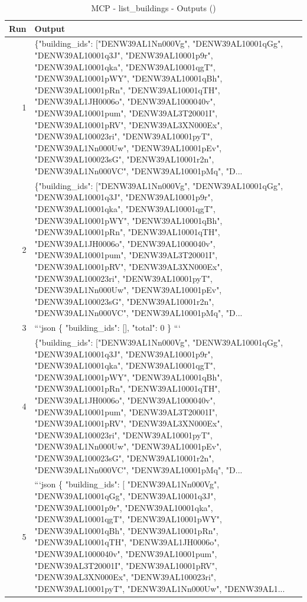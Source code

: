 \documentclass[a4paper,11pt]{article}
\begin{document}
\begin{table}[ht]
\centering
\scriptsize
\caption{MCP - list\_buildings - Outputs ()}
\label{tab:mcp\_list\_buildings\_outputs\_}
\begin{tabular}{r p{12cm}}
\hline
Run & Output \\
\hline
1 & \{"building\_ids": ["DENW39AL1Nn000Vg", "DENW39AL10001qGg", "DENW39AL10001q3J", "DENW39AL10001p9r", "DENW39AL10001qka", "DENW39AL10001qgT", "DENW39AL10001pWY", "DENW39AL10001qBh", "DENW39AL10001pRn", "DENW39AL10001qTH", "DENW39AL1JH0006o", "DENW39AL1000040v", "DENW39AL10001pum", "DENW39AL3T20001I", "DENW39AL10001pRV", "DENW39AL3XN000Ex", "DENW39AL100023ri", "DENW39AL10001pyT", "DENW39AL1Nn000Uw", "DENW39AL10001pEv", "DENW39AL100023sG", "DENW39AL10001r2n", "DENW39AL1Nn000VC", "DENW39AL10001pMq", "D... \\
2 & \{"building\_ids": ["DENW39AL1Nn000Vg", "DENW39AL10001qGg", "DENW39AL10001q3J", "DENW39AL10001p9r", "DENW39AL10001qka", "DENW39AL10001qgT", "DENW39AL10001pWY", "DENW39AL10001qBh", "DENW39AL10001pRn", "DENW39AL10001qTH", "DENW39AL1JH0006o", "DENW39AL1000040v", "DENW39AL10001pum", "DENW39AL3T20001I", "DENW39AL10001pRV", "DENW39AL3XN000Ex", "DENW39AL100023ri", "DENW39AL10001pyT", "DENW39AL1Nn000Uw", "DENW39AL10001pEv", "DENW39AL100023sG", "DENW39AL10001r2n", "DENW39AL1Nn000VC", "DENW39AL10001pMq", "D... \\
3 & ```json
\{
  "building\_ids": [],
  "total": 0
\}
``` \\
4 & \{"building\_ids": ["DENW39AL1Nn000Vg", "DENW39AL10001qGg", "DENW39AL10001q3J", "DENW39AL10001p9r", "DENW39AL10001qka", "DENW39AL10001qgT", "DENW39AL10001pWY", "DENW39AL10001qBh", "DENW39AL10001pRn", "DENW39AL10001qTH", "DENW39AL1JH0006o", "DENW39AL1000040v", "DENW39AL10001pum", "DENW39AL3T20001I", "DENW39AL10001pRV", "DENW39AL3XN000Ex", "DENW39AL100023ri", "DENW39AL10001pyT", "DENW39AL1Nn000Uw", "DENW39AL10001pEv", "DENW39AL100023sG", "DENW39AL10001r2n", "DENW39AL1Nn000VC", "DENW39AL10001pMq", "D... \\
5 & ```json
\{
  "building\_ids": [
    "DENW39AL1Nn000Vg",
    "DENW39AL10001qGg",
    "DENW39AL10001q3J",
    "DENW39AL10001p9r",
    "DENW39AL10001qka",
    "DENW39AL10001qgT",
    "DENW39AL10001pWY",
    "DENW39AL10001qBh",
    "DENW39AL10001pRn",
    "DENW39AL10001qTH",
    "DENW39AL1JH0006o",
    "DENW39AL1000040v",
    "DENW39AL10001pum",
    "DENW39AL3T20001I",
    "DENW39AL10001pRV",
    "DENW39AL3XN000Ex",
    "DENW39AL100023ri",
    "DENW39AL10001pyT",
    "DENW39AL1Nn000Uw",
    "DENW39AL1... \\

\end{tabular}
\end{table}
\end{document}
